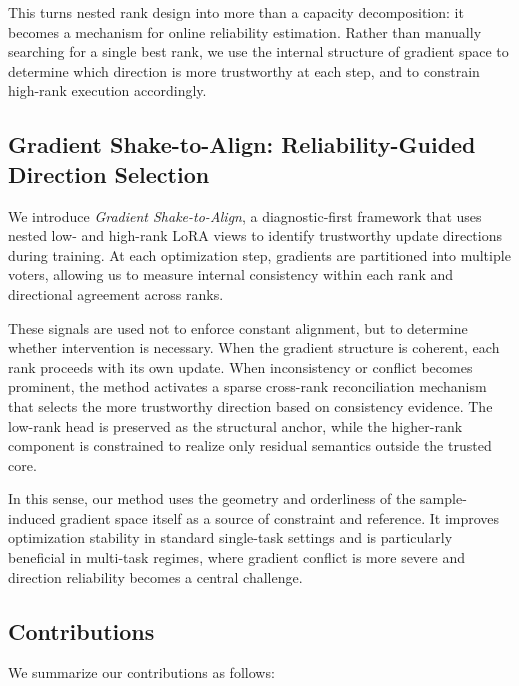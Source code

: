 \documentclass{article}
\begin{document}
This turns nested rank design into more than a capacity decomposition:
it becomes a mechanism for online reliability estimation.
Rather than manually searching for a single best rank, we use the internal
structure of gradient space to determine which direction is more trustworthy at
each step, and to constrain high-rank execution accordingly.

\subsection{Gradient Shake-to-Align: Reliability-Guided Direction Selection}

We introduce \emph{Gradient Shake-to-Align}, a diagnostic-first framework
that uses nested low- and high-rank LoRA views to identify trustworthy update
directions during training.
At each optimization step, gradients are partitioned into multiple voters,
allowing us to measure internal consistency within each rank and directional
agreement across ranks.

These signals are used not to enforce constant alignment, but to determine
whether intervention is necessary.
When the gradient structure is coherent, each rank proceeds with its own update.
When inconsistency or conflict becomes prominent, the method activates a sparse
cross-rank reconciliation mechanism that selects the more trustworthy direction
based on consistency evidence.
The low-rank head is preserved as the structural anchor, while the higher-rank
component is constrained to realize only residual semantics outside the trusted
core.

In this sense, our method uses the geometry and orderliness of the
sample-induced gradient space itself as a source of constraint and reference.
It improves optimization stability in standard single-task settings and is
particularly beneficial in multi-task regimes, where gradient conflict is more
severe and direction reliability becomes a central challenge.

\subsection{Contributions}

We summarize our contributions as follows:
\end{document}
